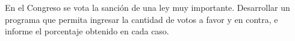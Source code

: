 En el Congreso se vota la sanción de una ley muy importante. Desarrollar un programa que permita ingresar la cantidad de votos a favor y en contra, e informe el porcentaje obtenido en cada caso.